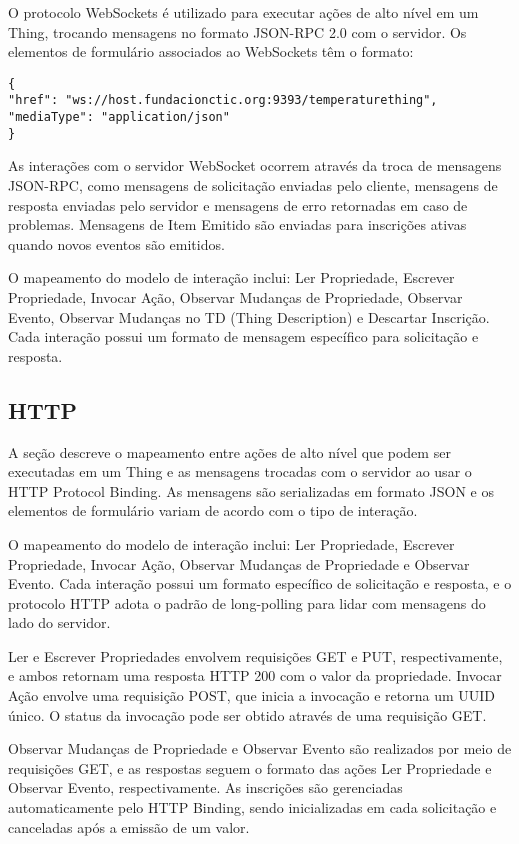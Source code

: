 O protocolo WebSockets é utilizado para executar ações de alto nível em um Thing, trocando mensagens no formato JSON-RPC 2.0 com o servidor. Os elementos de formulário associados ao WebSockets têm o formato:

\begin{verbatim}
{
"href": "ws://host.fundacionctic.org:9393/temperaturething",
"mediaType": "application/json"
}   
\end{verbatim}

As interações com o servidor WebSocket ocorrem através da troca de mensagens JSON-RPC, como mensagens de solicitação enviadas pelo cliente, mensagens de resposta enviadas pelo servidor e mensagens de erro retornadas em caso de problemas. Mensagens de Item Emitido são enviadas para inscrições ativas quando novos eventos são emitidos.

O mapeamento do modelo de interação inclui: Ler Propriedade, Escrever Propriedade, Invocar Ação, Observar Mudanças de Propriedade, Observar Evento, Observar Mudanças no TD (Thing Description) e Descartar Inscrição. Cada interação possui um formato de mensagem específico para solicitação e resposta.

\subsection{HTTP}

A seção descreve o mapeamento entre ações de alto nível que podem ser executadas em um Thing e as mensagens trocadas com o servidor ao usar o HTTP Protocol Binding. As mensagens são serializadas em formato JSON e os elementos de formulário variam de acordo com o tipo de interação.

O mapeamento do modelo de interação inclui: Ler Propriedade, Escrever Propriedade, Invocar Ação, Observar Mudanças de Propriedade e Observar Evento. Cada interação possui um formato específico de solicitação e resposta, e o protocolo HTTP adota o padrão de long-polling para lidar com mensagens do lado do servidor.

Ler e Escrever Propriedades envolvem requisições GET e PUT, respectivamente, e ambos retornam uma resposta HTTP 200 com o valor da propriedade. Invocar Ação envolve uma requisição POST, que inicia a invocação e retorna um UUID único. O status da invocação pode ser obtido através de uma requisição GET.

Observar Mudanças de Propriedade e Observar Evento são realizados por meio de requisições GET, e as respostas seguem o formato das ações Ler Propriedade e Observar Evento, respectivamente. As inscrições são gerenciadas automaticamente pelo HTTP Binding, sendo inicializadas em cada solicitação e canceladas após a emissão de um valor.

